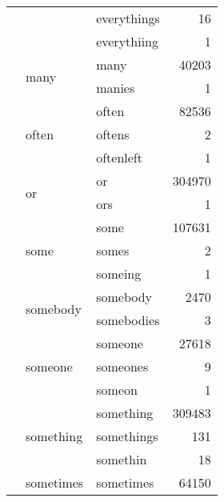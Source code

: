 \begin{longtable}[ht]{lllr}
 &  & everythings & {\cellcolor[HTML]{FFFFD9}} \color[HTML]{000000} 16 \\
 &  & everythiing & {\cellcolor[HTML]{FFFFD9}} \color[HTML]{000000} 1 \\
\cline{2-4}
 & \multirow[c]{2}{*}{many} & many & {\cellcolor[HTML]{ECF7B1}} \color[HTML]{000000} 40203 \\
 &  & manies & {\cellcolor[HTML]{FFFFD9}} \color[HTML]{000000} 1 \\
\cline{2-4}
 & \multirow[c]{3}{*}{often} & often & {\cellcolor[HTML]{BDE5B5}} \color[HTML]{000000} 82536 \\
 &  & oftens & {\cellcolor[HTML]{FFFFD9}} \color[HTML]{000000} 2 \\
 &  & oftenleft & {\cellcolor[HTML]{FFFFD9}} \color[HTML]{000000} 1 \\
\cline{2-4}
 & \multirow[c]{2}{*}{or} & or & {\cellcolor[HTML]{0B1F5E}} \color[HTML]{F1F1F1} 304970 \\
 &  & ors & {\cellcolor[HTML]{FFFFD9}} \color[HTML]{000000} 1 \\
\cline{2-4}
 & \multirow[c]{3}{*}{some} & some & {\cellcolor[HTML]{8ED3BA}} \color[HTML]{000000} 107631 \\
 &  & somes & {\cellcolor[HTML]{FFFFD9}} \color[HTML]{000000} 2 \\
 &  & someing & {\cellcolor[HTML]{FFFFD9}} \color[HTML]{000000} 1 \\
\cline{2-4}
 & \multirow[c]{2}{*}{somebody} & somebody & {\cellcolor[HTML]{FEFFD6}} \color[HTML]{000000} 2470 \\
 &  & somebodies & {\cellcolor[HTML]{FFFFD9}} \color[HTML]{000000} 3 \\
\cline{2-4}
 & \multirow[c]{3}{*}{someone} & someone & {\cellcolor[HTML]{F3FABD}} \color[HTML]{000000} 27618 \\
 &  & someones & {\cellcolor[HTML]{FFFFD9}} \color[HTML]{000000} 9 \\
 &  & someon & {\cellcolor[HTML]{FFFFD9}} \color[HTML]{000000} 1 \\
\cline{2-4}
 & \multirow[c]{3}{*}{something} & something & {\cellcolor[HTML]{081D58}} \color[HTML]{F1F1F1} 309483 \\
 &  & somethings & {\cellcolor[HTML]{FFFFD9}} \color[HTML]{000000} 131 \\
 &  & somethin & {\cellcolor[HTML]{FFFFD9}} \color[HTML]{000000} 18 \\
\cline{2-4}
 & sometimes & sometimes & {\cellcolor[HTML]{D4EEB3}} \color[HTML]{000000} 64150 \\
\cline{1-4} \cline{2-4}
\end{longtable}

